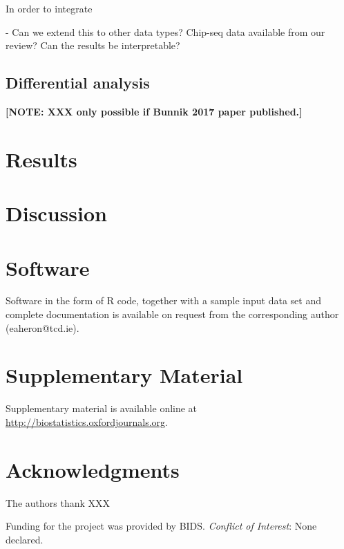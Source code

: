 \documentclass[oupdraft]{bio}
\newcommand{\note}[1]{\textbf{[NOTE: #1]}}
\begin{document}
In order to integrate


- Can we extend this to other data types? Chip-seq data available from our
review? Can the results be interpretable?

\subsection{Differential analysis}
\note{XXX only possible if Bunnik 2017 paper published.}

\section{Results}
\label{sec3}

\section{Discussion}
\label{sec4}



\section{Software}
\label{sec5}

Software in the form of R code, together with a sample
input data set and complete documentation is available on
request from the corresponding author (eaheron@tcd.ie).


\section{Supplementary Material}
\label{sec6}

Supplementary material is available online at
\url{http://biostatistics.oxfordjournals.org}.


\section*{Acknowledgments}

The authors thank XXX

Funding for the project was provided by BIDS.
{\it Conflict of Interest}: None declared.






\begin{figure}[!p]
\centering
\caption{}
\label{Fig1}
\end{figure}
\end{document}
